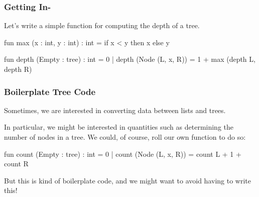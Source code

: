 \documentclass[aspectratio=169]{beamer}
\begin{document}
\begin{frame}[fragile]
  \frametitle{Getting In-}

  Let's write a simple function for computing the depth of a tree.

  \pause
  \begin{codeblock}
    fun max (x : int, y : int) : int =
      if x < y then x else y

    fun depth (Empty : tree) : int = 0
      | depth (Node (L, x, R)) = 1 + max (depth L, depth R)
  \end{codeblock}

  \vspace{\fill}


\end{frame}


\begin{frame}[fragile]
  \frametitle{Boilerplate Tree Code}

  Sometimes, we are interested in converting data between lists and trees.

  \pause
  \vspace{\fill}

  In particular, we might be interested in quantities such as determining the
  number of nodes in a tree. We could, of course, roll our own function to do
  so:

  \pause
  \begin{codeblock}
    fun count (Empty : tree) : int = 0
      | count (Node (L, x, R)) = count L + 1 + count R
  \end{codeblock}

  \pause
  \vspace{\fill}

  But this is kind of boilerplate code, and we might want to avoid having to
  write this!
\end{frame}
\end{document}
